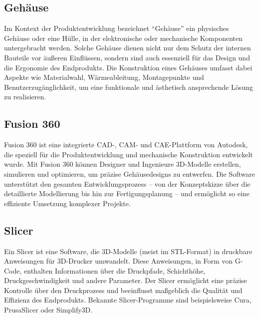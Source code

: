 \begin{inhalt}

\section{Gehäuse}  
Im Kontext der Produktentwicklung bezeichnet ``Gehäuse'' ein physisches Gehäuse oder eine Hülle, in der elektronische oder mechanische Komponenten untergebracht werden. Solche Gehäuse dienen nicht nur dem Schutz der internen Bauteile vor äußeren Einflüssen, sondern sind auch essenziell für das Design und die Ergonomie des Endprodukts. Die Konstruktion eines Gehäuses umfasst dabei Aspekte wie Materialwahl, Wärmeableitung, Montagepunkte und Benutzerzugänglichkeit, um eine funktionale und ästhetisch ansprechende Lösung zu realisieren.

\subsection{Fusion 360}
\label{ref:fusion360_grundlagen}
Fusion 360 \cite{Fusion360} ist eine integrierte CAD-, CAM- und CAE-Plattform von Autodesk, die speziell für die Produktentwicklung und mechanische Konstruktion entwickelt wurde. Mit Fusion 360 können Designer und Ingenieure 3D-Modelle erstellen, simulieren und optimieren, um präzise Gehäusedesigns zu entwerfen. Die Software unterstützt den gesamten Entwicklungsprozess – von der Konzeptskizze über die detaillierte Modellierung bis hin zur Fertigungsplanung – und ermöglicht so eine effiziente Umsetzung komplexer Projekte.

\subsection{Slicer}

Ein Slicer \cite{Slicer} ist eine Software, die 3D-Modelle (meist im STL-Format) in druckbare Anweisungen für 3D-Drucker umwandelt. Diese Anweisungen, in Form von G-Code, enthalten Informationen über die Druckpfade, Schichthöhe, Druckgeschwindigkeit und andere Parameter. Der Slicer ermöglicht eine präzise Kontrolle über den Druckprozess und beeinflusst maßgeblich die Qualität und Effizienz des Endprodukts. Bekannte Slicer-Programme sind beispielsweise Cura, PrusaSlicer oder Simplify3D.


\end{inhalt}